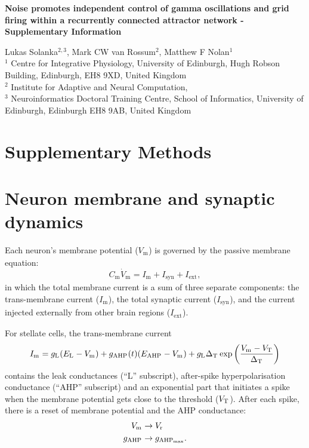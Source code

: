 \documentclass[a4paper,12pt]{article}
\newcommand{\ssc}[3]{\ensuremath{#1_{\text{#2}_{\text{#3}}}}}
\newcommand{\Cm}       {\ssc{C}      {m}     {}}
\newcommand{\Vm}       {\ssc{V}      {m}     {}}
\newcommand{\Imem}     {\ssc{I}      {m}     {}}
\newcommand{\Isyn}     {\ssc{I}      {syn}   {}}
\newcommand{\Iext}     {\ssc{I}      {ext}   {}}
\newcommand{\gL}       {\ssc{g}      {\scriptsize{L}}  {}}
\newcommand{\EL}       {\ssc{E}      {\scriptsize{L}}  {}}
\newcommand{\gAHP}     {\ssc{g}      {\scriptsize{AHP}}{}}
\newcommand{\gAHPmax}  {\ssc{g}      {\scriptsize{AHP}}{max}}
\newcommand{\EAHP}     {\ssc{E}      {\scriptsize{AHP}}{}}
\newcommand{\VT}       {\ssc{V}      {\scriptsize{T}}  {}}
\newcommand{\Vr}       {\ssc{V}      {r}     {}}
\newcommand{\deltaT}   {\ssc{\Delta} {\scriptsize{T}}{}}
\newcommand{\dVm}    {\ssc{\dot{V}}{m}   {}}
\begin{document}
\begin{center}
{\large\bfseries
Noise promotes independent control of gamma oscillations and grid firing within
a recurrently connected attractor network - Supplementary Information
}
\end{center}

\begin{flushleft}
Lukas Solanka$^{2,3}$,
Mark CW van Rossum$^{2}$,
Matthew F Nolan$^{1}$
\\
\vspace{2em}
$^1$
Centre for Integrative Physiology,
University of Edinburgh,
Hugh Robson Building,
Edinburgh, EH8 9XD,
United Kingdom
\\
$^2$
Institute for Adaptive and Neural Computation,
\\
$^3$
Neuroinformatics Doctoral Training Centre,
School of Informatics,
University of Edinburgh,
Edinburgh EH8 9AB,
United Kingdom
\end{flushleft}



\section*{Supplementary Methods} \label{methods}

\section{Neuron membrane and synaptic dynamics} \label{nrn_Vm_syn}

Each neuron's membrane potential ($\Vm$) is governed by the passive membrane equation:
\begin{equation}
    \Cm \dVm   = \Imem + \Isyn + \Iext,
    \label{eq:Vm}
\end{equation}
in which the total membrane current is a sum of three separate components: the
trans-membrane current ($\Imem$), the total synaptic current ($\Isyn$), and the
current injected externally from other brain regions ($\Iext$). 

For stellate cells, the trans-membrane current
\begin{equation}
    \Imem = \gL(\EL-\Vm) + \gAHP(t)(\EAHP - \Vm) + \gL \deltaT \exp\left(\frac{\Vm - \VT}{\deltaT}\right)
    \label{eq:Imem_st}
\end{equation}
contains the leak conductances (``L'' subscript), after-spike hyperpolarisation
conductance (``AHP'' subscript) and an exponential part that initiates a spike
when the membrane potential gets close to the threshold ($\VT$).  After each
spike, there is a reset of membrane potential and the AHP conductance:
\begin{align}
    \Vm   & \rightarrow \Vr       \notag \\
    \gAHP & \rightarrow \gAHPmax.
    \label{eq:afterspike_st}
\end{align}
\end{document}
